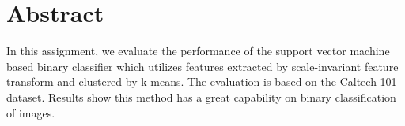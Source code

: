 \section{Abstract}
In this assignment, 
we evaluate the performance of the support vector machine based binary classifier
which utilizes features extracted by scale-invariant feature transform and clustered by k-means.
The evaluation is based on the Caltech 101 dataset. 
Results show this method has a great capability on binary classification of images.
